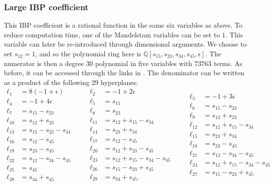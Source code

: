 \documentclass [a4paper,reqno, 11pt]{amsart}
\theoremstyle{plain}
\theoremstyle{plain}
\theoremstyle{plain}
\theoremstyle{plain}
\theoremstyle{definition}
\theoremstyle{definition}
\theoremstyle{definition}
\theoremstyle{definition}
\theoremstyle{definition}
\theoremstyle{definition}
\begin{document}
\subsubsection{Large IBP coefficient}\label{sssec:large feynman}
This IBP coefficient is a rational function in the same six variables as above. To reduce computation time, one of the Mandelstam variables can be set to $1$. This variable can later be re-introduced through dimensional arguments. We choose to set $s_{12}=1$, and so the polynomial ring here is $\mathbb{Q}[s_{15},s_{23},s_{34},s_{45},\epsilon]$. The numerator is then a degree $30$ polynomial in five variables with $73763$ terms. As before, it can be accessed through the links in \cite{BBD+}. The denominator can be written as a product of the following $29$ hyperplanes:
\begin{equation*}
    \begin{aligned}
    \ell_1&=8(-1+\epsilon)\\
    \ell_4&=-1+4\epsilon\\
    \ell_7&=s_{15}-s_{23}\\
    \ell_{10}&=s_{12}+s_{23}\\
    \ell_{13}&=s_{15}-s_{23}-s_{34}\\
    \ell_{16}&=s_{12}-s_{45}\\
    \ell_{19}&=s_{23}-s_{45}\\
    \ell_{22}&=s_{12}-s_{34}-s_{45}\\
    \ell_{25}&=s_{45}\\
    \ell_{28}&=s_{34}+s_{45}\\
\end{aligned}
\quad\quad
\begin{aligned}
    \ell_2&=-1+2\epsilon\\
    \ell_5&=s_{15}\\
    \ell_8&=s_{23}\\
    \ell_{11}&=s_{12}+s_{15}-s_{34}\\
    \ell_{14}&=s_{23}+s_{34}\\
    \ell_{17}&=s_{12}-s_{45}\\
    \ell_{20}&=s_{12}+s_{23}-s_{45}\\
    \ell_{23}&=s_{12}+s_{15}-s_{34}-s_{45}\\
    \ell_{26}&=s_{15}-s_{23}+s_{45}\\
    \ell_{29}&=s_{34}+s_{45}.\\
\end{aligned}
\quad\quad
\begin{aligned}
    \ell_3&=-1+3\epsilon\\
    \ell_6&=s_{15}-s_{23}\\
    \ell_9&=s_{12}+s_{23}\\
    \ell_{12}&=s_{12}+s_{15}-s_{34}\\
    \ell_{15}&=s_{23}+s_{34}\\
    \ell_{18}&=s_{23}-s_{45}\\
    \ell_{21}&=s_{12}-s_{34}-s_{45}\\
    \ell_{24}&=s_{12}+s_{15}-s_{34}-s_{45}\\
    \ell_{27}&=s_{15}-s_{23}+s_{45}\\
\end{aligned}
\end{equation*}
\end{document}
